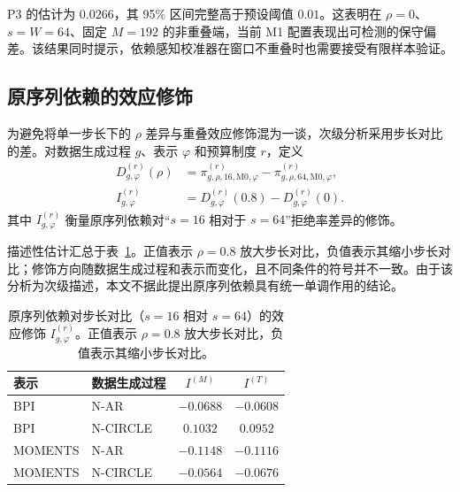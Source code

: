 P3 的估计为 $0.0266$，其 95\% 区间完整高于预设阈值 $0.01$。这表明在 $\rho=0$、$s=W=64$、固定 $M=192$ 的非重叠端，当前 M1 配置表现出可检测的保守偏差。该结果同时提示，依赖感知校准器在窗口不重叠时也需要接受有限样本验证。

\subsection{原序列依赖的效应修饰}\label{sec:h0-rho}

为避免将单一步长下的 $\rho$ 差异与重叠效应修饰混为一谈，次级分析采用步长对比的差。对数据生成过程 $g$、表示 $\varphi$ 和预算制度 $r$，定义
\begin{align}
 D_{g,\varphi}^{(r)}(\rho)
 &=\pi_{g,\rho,16,\mathrm{M0},\varphi}^{(r)}
  -\pi_{g,\rho,64,\mathrm{M0},\varphi}^{(r)},\\
 I_{g,\varphi}^{(r)}
 &=D_{g,\varphi}^{(r)}(0.8)-D_{g,\varphi}^{(r)}(0).
 \label{eq:rho-interaction}
\end{align}
其中 $I_{g,\varphi}^{(r)}$ 衡量原序列依赖对“$s=16$ 相对于 $s=64$”拒绝率差异的修饰。

描述性估计汇总于表~\ref{tab:rho-interaction}。正值表示 $\rho=0.8$ 放大步长对比，负值表示其缩小步长对比；修饰方向随数据生成过程和表示而变化，且不同条件的符号并不一致。由于该分析为次级描述，本文不据此提出原序列依赖具有统一单调作用的结论。

\begin{table}[ht]
\centering
\caption{原序列依赖对步长对比（$s=16$ 相对 $s=64$）的效应修饰 $I_{g,\varphi}^{(r)}$。正值表示 $\rho=0.8$ 放大步长对比，负值表示其缩小步长对比。}\label{tab:rho-interaction}
\begin{tabular}{llcc}
\toprule
表示 & 数据生成过程 & $I^{(M)}$ & $I^{(T)}$\\
\midrule
BPI & N-AR & $-0.0688$ & $-0.0608$\\
BPI & N-CIRCLE & $0.1032$ & $0.0952$\\
MOMENTS & N-AR & $-0.1148$ & $-0.1116$\\
MOMENTS & N-CIRCLE & $-0.0564$ & $-0.0676$\\
\bottomrule
\end{tabular}
\end{table}

